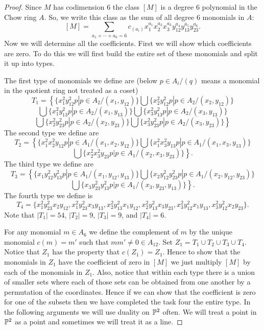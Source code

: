 \documentclass[12pt]{article}
\theoremstyle{plain}
\theoremstyle{definition}
\renewcommand{\P}{\ensuremath \mathbb{P}}
\begin{document}
\begin{proof} Since $M$ has codimension 6 the class $[M]$ is a degree 6 polynomial in the Chow ring $A$. So, we write this class as the sum of all degree 6 monomials in $A$: $$[M]=\sum\limits_{a_1+\cdots +a_6=6}c_{(a_i)}x_1^{a_1}x_2^{a_2}x_3^{a_3}y_{12}^{a_4}y_{13}^{a_5}y_{23}^{a_6} .$$ Now we will determine all the coefficients. First we will show which coefficients are zero. To do this we will first build the entire set of these monomials and split it up into types. 

The first type of monomials we define are (below $p\in A_i/(q)$ means a monomial in the quotient ring not treated as a coset)  $$T_1=\left\{ \{ x_1^2y_{12}^2p| p\in A_2/(x_1,y_{12})\} \bigcup \{ x_2^2y_{12}^2p| p\in A_2/(x_2,y_{12})\} \right.$$ $$ \bigcup \{ x_1^2y_{13}^2p| p\in A_2/(x_1,y_{13})\} \bigcup \{ x_3^2y_{13}^2p| p\in A_2/(x_3,y_{13})\} $$ $$\left. \bigcup \{ x_2^2y_{23}^2p| p\in A_2/(x_2,y_{23})\} 
\bigcup \{ x_3^2y_{23}^2p| p\in A_2/(x_3,y_{23})\}
\right\}$$ The second type we define are $$T_2=\left\{ \{x_1^2x_2^2y_{12}p|p\in A_1/(x_1,x_2,y_{12})\} \bigcup \{x_1^2x_3^2y_{13}p|p\in A_1/(x_1,x_3,y_{13})\} \right. $$ $$ \left. \bigcup \{x_2^2x_3^2y_{23}p|p\in A_1/(x_2,x_3,y_{23})\} \right\} .$$ The third type we define are $$T_3=\left\{ \{x_1y_{12}^2y_{13}^2p|p\in A_1/(x_1,y_{12},y_{13})\} \bigcup \{x_2y_{12}^2y_{23}^2p|p\in A_1/(x_2,y_{12},y_{23})\} \right. $$ $$ \left. \bigcup \{x_3y_{23}^2y_{13}^2p|p\in A_1/(x_3,y_{23},y_{13})\} \right\} .$$ The fourth type we define is $$T_4=\{ x_1^2y_{23}^2x_2y_{12},x_1^2y_{23}^2x_3y_{13},x_2^2y_{13}^2x_1y_{12},x_2^2y_{13}^2x_3y_{23},x_3^2y_{12}^2x_1y_{13},x_3^2y_{12}^2x_2y_{23}\} .$$ Note that $|T_1|=54$, $|T_2|=9$, $|T_3|=9$, and $|T_4|=6$.

For any monomial $m\in A_6$ we define the complement of $m$ by the unique monomial  $c(m)=m'$ such that $mm'\neq 0 \in A_{12}$. Set $Z_1=T_1\cup T_2\cup T_3\cup T_4$. Notice that $Z_1$ has the property that $c(Z_1)=Z_1$. Hence to show that the monomials in $Z_1$ have the coefficient of zero in $[M]$ we just multiply $[M]$ by each of the monomials in $Z_1$. Also, notice that within each type there is a union of smaller sets where each of those sets can be obtained from one another by a permutation of the coordinates. Hence if we can show that the coefficient is zero for one of the subsets then we have completed the task four the entire type. In the following arguments we will use duality on $\P^2$ often. We will treat a point in $\P^2$ as a point and sometimes we will treat it as a line.


\end{proof}
\end{document}
